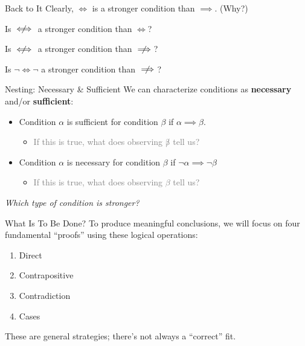 \documentclass[10pt]{beamer}
\begin{document}
\begin{frame}{Back to It}
    Clearly, $\iff$ is a stronger condition than $\implies$. (Why?)

    \pause
    Is $\centernot\iff$ a stronger condition than $\iff$?

    \pause
    Is $\centernot\iff$ a stronger condition than $\centernot\implies$?

    \pause
    Is $\neg \iff \neg$ a stronger condition than $\centernot\implies$?
\end{frame}


\begin{frame}{Nesting: Necessary \& Sufficient}
    We can characterize conditions as \textbf{necessary} and/or \textbf{sufficient}:

    \begin{itemize}
        \item Condition $\alpha$ is sufficient for condition $\beta$ if $\alpha \implies \beta$.
        \begin{itemize}
            \item \textcolor{gray}{If this is true, what does observing $\not \beta$ tell us?}
        \end{itemize}
        \item Condition $\alpha$ is necessary for condition $\beta$ if $\neg \alpha \implies \neg \beta$
        \begin{itemize}
            \item \textcolor{gray}{If this is true, what does observing $\beta$ tell us?}
        \end{itemize}
    \end{itemize}

    \emph{Which type of condition is stronger?}
\end{frame}



\begin{frame}{What Is To Be Done?}
    To produce meaningful conclusions, we will focus on four fundamental ``proofs'' using these logical operations:

    \begin{enumerate}
        \item Direct
        \item Contrapositive
        \item Contradiction
        \item Cases
    \end{enumerate}

    These are general strategies; there's not always a ``correct'' fit.
\end{frame}
\end{document}
